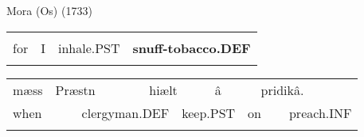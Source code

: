 \begin{listWWNumileveli}
\item 

\end{listWWNumileveli}

\begin{listWWNumxciiileveli}
\item 

\begin{styleExLtrTbl}
Mora (Os) (1733)

\end{styleExLtrTbl}

\end{listWWNumxciiileveli}

\begin{styleBodyTextFirst}

\end{styleBodyTextFirst}

\begin{tabular}{llll}
\lsptoprule
\multicolumn{4}{l}{fær

}\\
for & I & inhale.PST & {\bfseries snuff-tobacco.DEF}\\
\lspbottomrule
\end{tabular}

\begin{tabular}{llllllllll}
\lsptoprule
mæss & \multicolumn{2}{l}{Præstn

} & \multicolumn{2}{l}{hiælt

} & \multicolumn{2}{l}{â

} & \multicolumn{2}{l}{pridikâ.

} & \\
\multicolumn{2}{l}{when

} & \multicolumn{2}{l}{clergyman.DEF

} & \multicolumn{2}{l}{keep.PST

} & \multicolumn{2}{l}{on 

} & \multicolumn{2}{l}{preach.INF

}\\
\lspbottomrule
\end{tabular}

\begin{styleExLtrTblii}
\citet{Swedish1733}

\end{styleExLtrTblii}

\begin{styleBodyTextFirst}

\end{styleBodyTextFirst}

